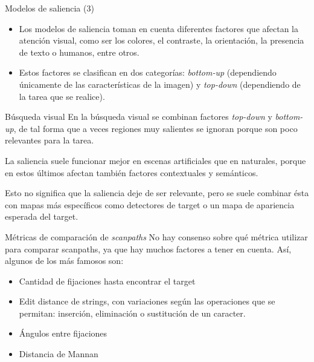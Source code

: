 \documentclass[compress]{beamer}
\begin{document}
\begin{frame}{Modelos de saliencia (3)}
\begin{itemize}
\item Los modelos de saliencia toman en cuenta diferentes factores que afectan la atención visual, como ser los colores, el contraste, la orientación, la presencia de texto o humanos, entre otros.
\item Estos factores se clasifican en dos categorías: \textit{bottom-up} (dependiendo únicamente de las características de la imagen) y \textit{top-down} (dependiendo de la tarea que se realice).
\end{itemize}
\end{frame}

\begin{frame}{Búsqueda visual}
En la búsqueda visual se combinan factores \textit{top-down} y \textit{bottom-up}, de tal forma que a veces regiones muy salientes se ignoran porque son poco relevantes para la tarea.

\bigskip
La saliencia suele funcionar mejor en escenas artificiales que en naturales, porque en estos últimos afectan también factores contextuales y semánticos.

\bigskip

Esto no significa que la saliencia deje de ser relevante, pero se suele combinar ésta con mapas más específicos como detectores de target o un mapa de apariencia esperada del target.

\end{frame}


\begin{frame}{Métricas de comparación de \textit{scanpaths}}
No hay consenso sobre qué métrica utilizar para comparar scanpaths, ya que hay muchos factores a tener en cuenta. Así, algunos de los más famosos son:
\begin{itemize}
\item Cantidad de fijaciones hasta encontrar el target
\item Edit distance de strings, con variaciones según las operaciones que se permitan: inserción, eliminación o sustitución de un caracter.
\item Ángulos entre fijaciones
\item Distancia de Mannan
\end{itemize}
\end{frame}
\end{document}
